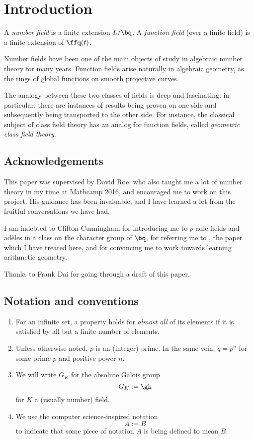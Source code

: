 \chapter*{Introduction}

A \textit{number field} is a finite extension $L/\bq$. A \textit{function field}
(over a finite field) is a finite extension of $\ffq(t)$.

Number fields have been one of the main objects of study in algebraic number
theory for many years. Function fields arise naturally in algebraic geometry, as
the rings of global functions on smooth projective curves.

The analogy between these two classes of fields is deep and fascinating: in
particular, there are instances of results being proven on one side and
subsequently being transported to the other side. For instance, the classical
subject of class field theory has an analog for function fields, called
\textit{geometric class field theory}.

\section*{Acknowledgements}
This paper was supervised by David Roe, who also taught me a lot of number
theory in my time at Mathcamp 2016, and encouraged me to work on this project.
His guidance has been invaluable, and I have learned a lot from the fruitful
conversations we have had.

I am indebted to Clifton Cunningham for introducing me to $p$-adic fields and
ad\`eles in a class on the character group of $\bq$, for referring me to
\cite{artinwhaples}, the paper which I have treated here, and for convincing me
to work towards learning arithmetic geometry.

Thanks to Frank Dai for going through a draft of this paper.

\section*{Notation and conventions}
\begin{enumerate}
\item For an infinite set, a property holds for \textit{almost all} of its
  elements if it is satisfied by all but a finite number of elements.
\item Unless otherwise noted, $p$ is an (integer) prime. In the same vein, $q=
  p^n$ for some prime $p$ and positive power $n$.
\item We will write $G_K$ for the absolute Galois group
  \[ G_K := \gk \]
  for $K$ a (usually number) field.
\item We use the computer science-inspired notation
  \[ A := B \]
  to indicate that some piece of notation $A$ is being defined to mean $B$.
\end{enumerate}
